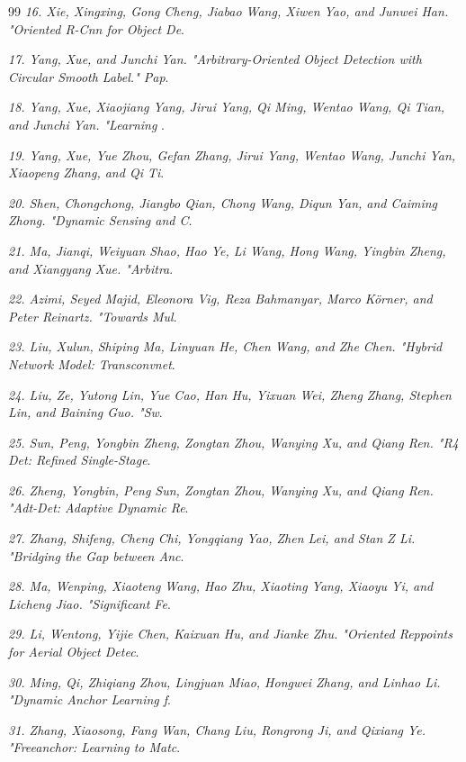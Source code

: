 \documentclass[journal]{IEEEtran}
\begin{document}
\begin{thebibliography}{99}
\textit{16.	Xie, Xingxing, Gong Cheng, Jiabao Wang, Xiwen Yao, and Junwei Han. "Oriented R-Cnn for Object De}.

\textit{17.	Yang, Xue, and Junchi Yan. "Arbitrary-Oriented Object Detection with Circular Smooth Label." Pap}.

\textit{18.	Yang, Xue, Xiaojiang Yang, Jirui Yang, Qi Ming, Wentao Wang, Qi Tian, and Junchi Yan. "Learning }.

\textit{19.	Yang, Xue, Yue Zhou, Gefan Zhang, Jirui Yang, Wentao Wang, Junchi Yan, Xiaopeng Zhang, and Qi Ti}.

\textit{20.	Shen, Chongchong, Jiangbo Qian, Chong Wang, Diqun Yan, and Caiming Zhong. "Dynamic Sensing and C}.

\textit{21.	Ma, Jianqi, Weiyuan Shao, Hao Ye, Li Wang, Hong Wang, Yingbin Zheng, and Xiangyang Xue. "Arbitra}.

\textit{22.	Azimi, Seyed Majid, Eleonora Vig, Reza Bahmanyar, Marco Körner, and Peter Reinartz. "Towards Mul}.

\textit{23.	Liu, Xulun, Shiping Ma, Linyuan He, Chen Wang, and Zhe Chen. "Hybrid Network Model: Transconvnet}.

\textit{24.	Liu, Ze, Yutong Lin, Yue Cao, Han Hu, Yixuan Wei, Zheng Zhang, Stephen Lin, and Baining Guo. "Sw}.

\textit{25.	Sun, Peng, Yongbin Zheng, Zongtan Zhou, Wanying Xu, and Qiang Ren. "R4 Det: Refined Single-Stage}.

\textit{26.	Zheng, Yongbin, Peng Sun, Zongtan Zhou, Wanying Xu, and Qiang Ren. "Adt-Det: Adaptive Dynamic Re}.

\textit{27.	Zhang, Shifeng, Cheng Chi, Yongqiang Yao, Zhen Lei, and Stan Z Li. "Bridging the Gap between Anc}.

\textit{28.	Ma, Wenping, Xiaoteng Wang, Hao Zhu, Xiaoting Yang, Xiaoyu Yi, and Licheng Jiao. "Significant Fe}.

\textit{29.	Li, Wentong, Yijie Chen, Kaixuan Hu, and Jianke Zhu. "Oriented Reppoints for Aerial Object Detec}.

\textit{30.	Ming, Qi, Zhiqiang Zhou, Lingjuan Miao, Hongwei Zhang, and Linhao Li. "Dynamic Anchor Learning f}.

\textit{31.	Zhang, Xiaosong, Fang Wan, Chang Liu, Rongrong Ji, and Qixiang Ye. "Freeanchor: Learning to Matc}.


\end{thebibliography}
\end{document}
